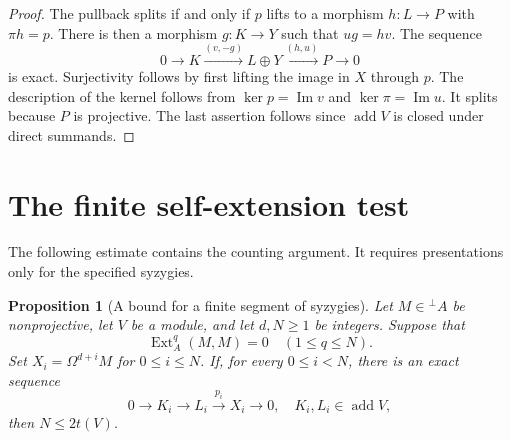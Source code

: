 \documentclass[a4paper,reqno]{amsart}
\numberwithin{equation}{section}
\newtheorem{prop}[thm]{Proposition}
\theoremstyle{definition}
\DeclareMathOperator{\Ext}{Ext}
\DeclareMathOperator{\add}{add}
\DeclareMathOperator{\im}{Im}
\newcommand{\perpA}{{}^{\perp}A}
\begin{document}
\begin{proof}
The pullback splits if and only if $p$ lifts to a morphism $h:L\to P$ with $\pi h=p$. There is then a morphism $g:K\to Y$ such that $ug=hv$. The sequence
\[
0\longrightarrow K\xrightarrow{(v,-g)}L\oplus Y
\xrightarrow{(h,u)}P\longrightarrow0
\]
is exact. Surjectivity follows by first lifting the image in $X$ through $p$. The description of the kernel follows from $\ker p=\im v$ and $\ker\pi=\im u$. It splits because $P$ is projective. The last assertion follows since $\add V$ is closed under direct summands.
\end{proof}

\section{The finite self-extension test}\label{sec:main}

The following estimate contains the counting argument. It requires presentations only for the specified syzygies.

\begin{prop}[A bound for a finite segment of syzygies]\label{prop:segment}
Let $M\in\perpA$ be nonprojective, let $V$ be a module, and let $d,N\geq1$ be integers. Suppose that
\[
\Ext_A^q(M,M)=0\quad(1\leq q\leq N).
\]
Set $X_i=\Omega^{d+i}M$ for $0\leq i\leq N$. If, for every $0\leq i<N$, there is an exact sequence
\begin{equation}\label{eq:presentation}
0\longrightarrow K_i\longrightarrow L_i\xrightarrow{p_i}X_i\longrightarrow0,
\quad K_i,L_i\in\add V,
\end{equation}
then $N\leq2t(V)$.
\end{prop}
\end{document}
